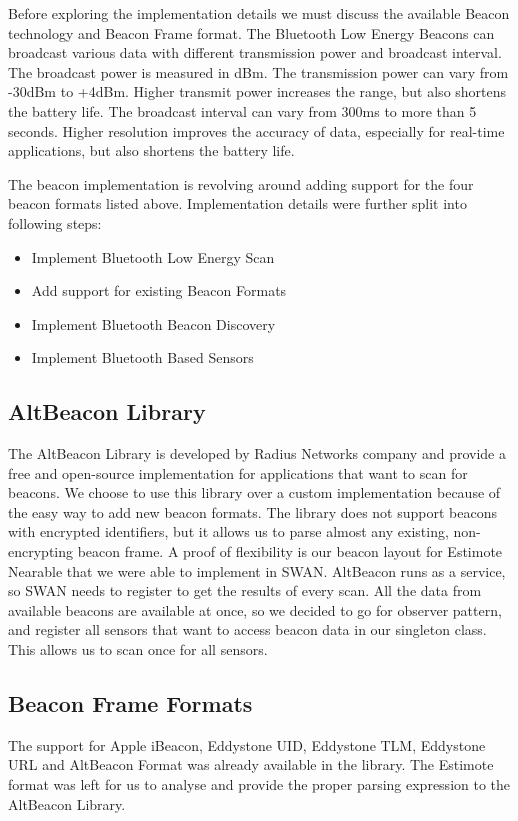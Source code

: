 Before exploring the implementation details we must discuss the available Beacon technology and Beacon Frame format.
The Bluetooth Low Energy Beacons can broadcast various data with different transmission power and broadcast interval.
The broadcast power is measured in dBm\cite{dbiRef}. The transmission power can vary from -30dBm to +4dBm. Higher transmit power
increases the range, but also shortens the battery life. The broadcast interval can vary from 300ms to more than 5 seconds. Higher resolution improves the accuracy of data,
especially for real-time applications, but also shortens the battery life.


The beacon implementation is revolving around adding support for the four beacon formats listed above. Implementation details were further split into 
following steps:
\begin{itemize}
 \item Implement Bluetooth Low Energy Scan
 \item Add support for existing Beacon Formats
 \item Implement Bluetooth Beacon Discovery
 \item Implement Bluetooth Based Sensors
\end{itemize}

\subsection{AltBeacon Library}
The AltBeacon Library is developed by Radius Networks\cite{radius_networks} company and provide a free and open-source implementation for applications that want to scan for beacons.
We choose to use this library over a custom implementation because of the easy way to add new beacon formats. The library does not support beacons with encrypted 
identifiers, but it allows us to parse almost any existing, non-encrypting beacon frame. A proof of flexibility is our beacon layout for Estimote Nearable that we were able to 
implement in SWAN.
AltBeacon runs as a service, so SWAN needs to register to get the results of every scan. All the data from available beacons are available at once, so we decided to go for observer 
pattern, and register all sensors that want to access beacon data in our singleton class. This allows us to scan once for all sensors.

\subsection{Beacon Frame Formats}
The support for Apple iBeacon, Eddystone UID, Eddystone TLM, Eddystone URL and AltBeacon Format was already available in the library.
The Estimote format was left for us to analyse and provide the proper parsing expression to the AltBeacon Library.

